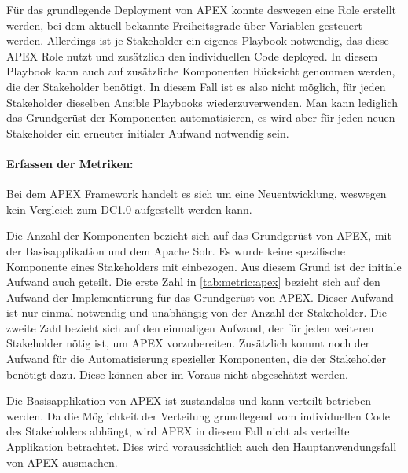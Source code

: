 Für das grundlegende Deployment von APEX konnte deswegen eine Role erstellt werden, bei dem aktuell bekannte Freiheitsgrade über Variablen gesteuert werden. Allerdings ist je Stakeholder ein eigenes Playbook notwendig, das diese APEX Role nutzt und zusätzlich den individuellen Code deployed. In diesem Playbook kann auch auf zusätzliche Komponenten Rücksicht genommen werden, die der Stakeholder benötigt. In diesem Fall ist es also nicht möglich, für jeden Stakeholder dieselben Ansible Playbooks wiederzuverwenden. Man kann lediglich das Grundgerüst der Komponenten automatisieren, es wird aber für jeden neuen Stakeholder ein erneuter initialer Aufwand notwendig sein.

\paragraph{Erfassen der Metriken:}
Bei dem APEX Framework handelt es sich um eine Neuentwicklung, weswegen kein Vergleich zum DC1.0 aufgestellt werden kann. 

Die Anzahl der Komponenten bezieht sich auf das Grundgerüst von APEX, mit der Basisapplikation und dem Apache Solr. Es wurde keine spezifische Komponente eines Stakeholders mit einbezogen. Aus diesem Grund ist der initiale Aufwand auch geteilt. Die erste Zahl in \autoref{tab:metric:apex} bezieht sich auf den Aufwand der Implementierung für das Grundgerüst von APEX. Dieser Aufwand ist nur einmal notwendig und unabhängig von der Anzahl der Stakeholder. Die zweite Zahl bezieht sich auf den einmaligen Aufwand, der für jeden weiteren Stakeholder nötig ist, um APEX vorzubereiten. Zusätzlich kommt noch der Aufwand für die Automatisierung spezieller Komponenten, die der Stakeholder benötigt dazu. Diese können aber im Voraus nicht abgeschätzt werden.

Die Basisapplikation von APEX ist zustandslos und kann verteilt betrieben werden. Da die Möglichkeit der Verteilung grundlegend vom individuellen Code des Stakeholders abhängt, wird APEX in diesem Fall nicht als verteilte Applikation betrachtet. Dies wird voraussichtlich auch den Hauptanwendungsfall von APEX ausmachen. 

